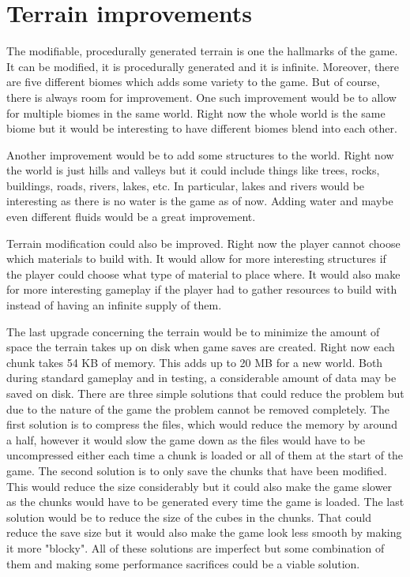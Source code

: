 \section{Terrain improvements}
The modifiable, procedurally generated terrain is one the hallmarks of the game.
It can be modified, it is procedurally generated and it is infinite.
Moreover, there are five different biomes which adds some variety to the game.
But of course, there is always room for improvement.
One such improvement would be to allow for multiple biomes in the same world.
Right now the whole world is the same biome but it would be interesting to have different biomes blend into each other.

Another improvement would be to add some structures to the world.
Right now the world is just hills and valleys but it could include things like trees, rocks, buildings, roads, rivers, lakes, etc.
In particular, lakes and rivers would be interesting as there is no water is the game as of now.
Adding water and maybe even different fluids would be a great improvement.

Terrain modification could also be improved.
Right now the player cannot choose which materials to build with.
It would allow for more interesting structures if the player could choose what type of material to place where.
It would also make for more interesting gameplay if the player had to gather resources to build with instead of having an infinite supply of them.

The last upgrade concerning the terrain would be to minimize the amount of space the terrain takes up on disk when game saves are created.
Right now each chunk takes 54 KB of memory.
This adds up to 20 MB for a new world.
Both during standard gameplay and in testing, a considerable amount of data may be saved on disk.
There are three simple solutions that could reduce the problem but due to the nature of the game the problem cannot be removed completely.
The first solution is to compress the files, which would reduce the memory by around a half, however it would slow the game down as the files would have to be uncompressed either each time a chunk is loaded or all of them at the start of the game.
The second solution is to only save the chunks that have been modified.
This would reduce the size considerably but it could also make the game slower as the chunks would have to be generated every time the game is loaded.
The last solution would be to reduce the size of the cubes in the chunks.
That could reduce the save size but it would also make the game look less smooth by making it more "blocky".
All of these solutions are imperfect but some combination of them and making some performance sacrifices could be a viable solution.